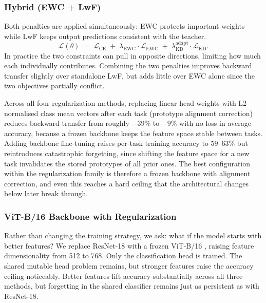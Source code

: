\documentclass{article}
\begin{document}
\subsubsection{Hybrid (EWC + LwF)}

Both penalties are applied simultaneously: EWC protects important weights
while LwF keeps output predictions consistent with the teacher.
\begin{equation}
  \mathcal{L}(\theta) \;=\;
  \mathcal{L}_{\mathrm{CE}} \;+\;
  \lambda_{\mathrm{EWC}} \cdot \mathcal{L}_{\mathrm{EWC}} \;+\;
  \lambda_{\mathrm{KD}}^{\mathrm{adapt}} \cdot \mathcal{L}_{\mathrm{KD}}.
\end{equation}
In practice the two constraints can pull in opposite directions, limiting
how much each individually contributes.
Combining the two penalties improves backward transfer slightly over standalone LwF, but adds little over EWC alone since the two objectives partially conflict.

Across all four regularization methods, replacing linear head weights with L2-normalised class mean vectors after each task (prototype alignment correction) reduces backward transfer from roughly $-39\%$ to $-9\%$ with no loss in average accuracy, because a frozen backbone keeps the feature space stable between tasks. Adding backbone fine-tuning raises per-task training accuracy to $59$--$63\%$ but reintroduces catastrophic forgetting, since shifting the feature space for a new task invalidates the stored prototypes of all prior ones. The best configuration within the regularization family is therefore a frozen backbone with alignment correction, and even this reaches a hard ceiling that the architectural changes below later break through.

\subsubsection{ViT-B/16 Backbone with Regularization}

Rather than changing the training strategy, we ask: what if the model starts
with better features? We replace ResNet-18 with a frozen ViT-B/16
\citep{dosovitskiy2020image}, raising feature dimensionality from 512 to 768.
Only the classification head is trained. The shared mutable head problem
remains, but stronger features raise the accuracy ceiling noticeably.
Better features lift accuracy substantially across all three methods, but forgetting in the shared classifier remains just as persistent as with ResNet-18.
\end{document}
